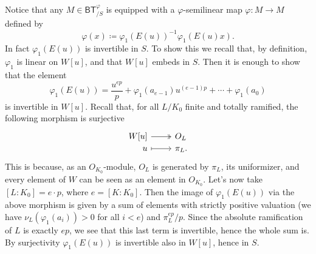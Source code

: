\begin{rem}[]\label{invertibilityphi1E(u))}
	Notice that any $M \in \mathsf{BT}^{\varphi}_{/S}$ is equipped with a 
	$\varphi$-semilinear map $\varphi\colon M \to M$ defined by
	\begin{equation*}
		\varphi (x) \coloneqq \varphi_1 \left( E(u) \right)^{-1} \varphi_1 (E(u)x)
	.\end{equation*}
	In fact $\varphi_1(E(u))$ is invertible in $S$.
	To show this we recall that, by definition, $\varphi_1$ is
	linear on $W[u]$, and that $W[u]$ embeds in $S$.
	Then it is enough to show that the element
	\begin{equation*}
		\varphi_1(E(u)) =
		\frac{ u^{ep} }{ p } + \varphi_1(a_{e-1}) u^{(e-1)p} +
		\cdots + \varphi_1(a_0)
	\end{equation*}
	is invertible in $W[u]$.
	Recall that,
	for all $L/K_0$ finite and totally ramified,
	the following morphism is surjective 
	\begin{equation*}
	\begin{tikzcd}[row sep = 0ex
		,/tikz/column 1/.append style={anchor=base east}
		,/tikz/column 2/.append style={anchor=base west}]
		W[u] \arrow[r, "", twoheadrightarrow] &
		O_{L} \\
		u \arrow[r, "", mapsto] & 
		\pi_L
	.\end{tikzcd}
	\end{equation*} 
	This is because, as an $O_{K_0}$-module, $O_L$ is generated by $\pi_L$, its uniformizer,
	and every element of $W$ can be seen as an element in $O_{K_0}$.
	Let's now take $[ L : K_0 ] = e \cdot p$, where $e = [ K : K_0 ]$.
	Then the image of $\varphi_1(E(u))$ via the above morphism is given by a sum of
	elements with strictly positive valuation 
	(we have $\nu_L(\varphi_1(a_i)) > 0$ for all $i < e$) and $\pi_L^{ep}/p$.
	Since the absolute ramification of $L$ is exactly $ep$, we see that this
	last term is invertible, hence the whole sum is.
	By surjectivity $\varphi_1(E(u))$ is invertible also in $W[u]$,
	hence in $S$.
\end{rem}


